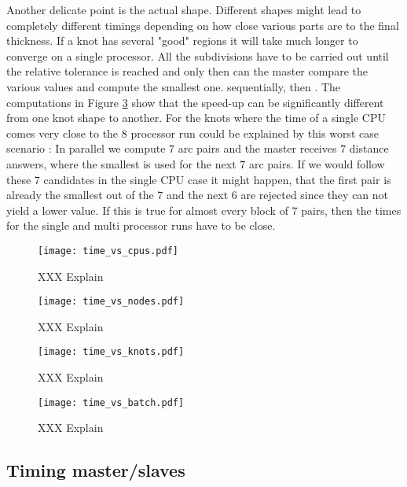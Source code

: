 \documentclass{article}
\begin{document}
Another delicate point is the actual shape. Different shapes might lead to completely different
timings depending on how close various parts are to the final thickness. If a knot has several
"good" regions it will take much longer to converge on a single processor. All the subdivisions
have to be carried out until the relative tolerance is reached and only then can the master
compare the various values and compute the smallest one. sequentially, then . The computations
in Figure \ref{fig:time_vs_knots} show that the speed-up can be significantly different from
one knot shape to another. For the knots where the time of a single CPU comes very close to the $8$
processor run could be explained by this worst case scenario : In parallel we compute $7$ arc pairs
and the master receives $7$ distance answers, where the smallest is used for the next $7$ arc pairs.
If we would follow these $7$ candidates in the single CPU case it might happen, that the first
pair is already the smallest out of the $7$ and the next $6$ are rejected since they can not yield
a lower value. If this is true for almost every block of $7$ pairs, then the times for the single
and multi processor runs have to be close.

\begin{figure}
\texttt{[image: time\_vs\_cpus.pdf]}
\caption{XXX Explain \label{fig:time_vs_cpus}}
\end{figure}

\begin{figure}
\texttt{[image: time\_vs\_nodes.pdf]}
\caption{XXX Explain \label{fig:time_vs_nodes}}
\end{figure}

\begin{figure}
\texttt{[image: time\_vs\_knots.pdf]}
\caption{XXX Explain \label{fig:time_vs_knots}}
\end{figure}

\begin{figure}
\texttt{[image: time\_vs\_batch.pdf]}
\caption{XXX Explain \label{fig:time_vs_batch}}
\end{figure}


\subsection{Timing master/slaves}

\end{document}

